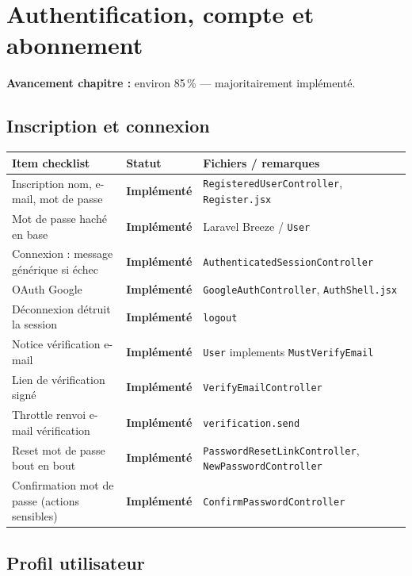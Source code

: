 \documentclass[11pt,a4paper]{report}
\newcommand{\route}[1]{\texttt{\small #1}}
\newcommand{\ctrl}[1]{\texttt{\small #1}}
\newcommand{\model}[1]{\texttt{\small #1}}
\newcommand{\statimpl}{\textcolor{statok}{\textbf{Implémenté}}}
\begin{document}
\chapter{Authentification, compte et abonnement}

\textbf{Avancement chapitre :} environ 85\,\% — majoritairement implémenté.

\section{Inscription et connexion}

\renewcommand{\arraystretch}{1.2}
\begin{longtable}{@{}L{7.8cm}C{2.4cm}L{4.4cm}@{}}
    \toprule
    \textbf{Item checklist} & \textbf{Statut} & \textbf{Fichiers / remarques} \\
    \midrule
    \endhead
    Inscription nom, e-mail, mot de passe & \statimpl & \ctrl{RegisteredUserController}, \route{Register.jsx} \\
    Mot de passe haché en base & \statimpl & Laravel Breeze / \model{User} \\
    Connexion : message générique si échec & \statimpl & \ctrl{AuthenticatedSessionController} \\
    OAuth Google & \statimpl & \ctrl{GoogleAuthController}, \route{AuthShell.jsx} \\
    Déconnexion détruit la session & \statimpl & \route{logout} \\
    Notice vérification e-mail & \statimpl & \model{User} implements \texttt{MustVerifyEmail} \\
    Lien de vérification signé & \statimpl & \ctrl{VerifyEmailController} \\
    Throttle renvoi e-mail vérification & \statimpl & \route{verification.send} \\
    Reset mot de passe bout en bout & \statimpl & \ctrl{PasswordResetLinkController}, \ctrl{NewPasswordController} \\
    Confirmation mot de passe (actions sensibles) & \statimpl & \ctrl{ConfirmPasswordController} \\
    \bottomrule
\end{longtable}

\section{Profil utilisateur}
\end{document}
